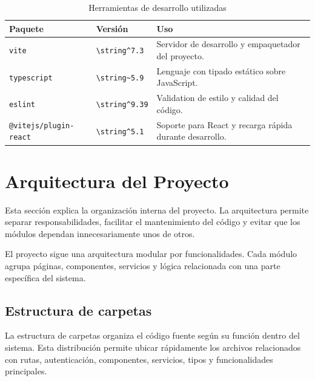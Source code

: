 \documentclass[12pt,letterpaper]{article}
\newcommand{\code}[1]{\nolinkurl{#1}}
\begin{document}
\begin{longtable}{|p{}|p{}|p{}|}
\caption{Herramientas de desarrollo utilizadas}\\
\hline
\textbf{Paquete} & \textbf{Versión} & \textbf{Uso} \\
\hline
\code{vite} & \code{\string^7.3} & Servidor de desarrollo y empaquetador del proyecto. \\
\hline
\code{typescript} & \code{\string~5.9} & Lenguaje con tipado estático sobre JavaScript. \\
\hline
\code{eslint} & \code{\string^9.39} & Validation de estilo y calidad del código. \\
\hline
\code{@vitejs/plugin-react} & \code{\string^5.1} & Soporte para React y recarga rápida durante desarrollo. \\
\hline
\end{longtable}

\section{Arquitectura del Proyecto}

Esta sección explica la organización interna del proyecto. La arquitectura permite separar responsabilidades, facilitar el mantenimiento del código y evitar que los módulos dependan innecesariamente unos de otros.

El proyecto sigue una arquitectura modular por funcionalidades. Cada módulo agrupa páginas, componentes, servicios y lógica relacionada con una parte específica del sistema.

\subsection{Estructura de carpetas}

La estructura de carpetas organiza el código fuente según su función dentro del sistema. Esta distribución permite ubicar rápidamente los archivos relacionados con rutas, autenticación, componentes, servicios, tipos y funcionalidades principales.
\end{document}
